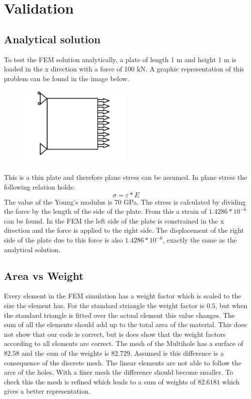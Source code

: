 \chapter{Validation}

\section{Analytical solution}
To test the FEM solution analytically, a plate of length 1 m and height 1 m is loaded in the x direction with a force of 100 kN. A graphic representation of this problem can be found in the image below.

\begin{figure}[h!]
    \parbox [t]{\textwidth}
        {
        \center
        \includegraphics[width=0.5\textwidth]{IMG/analytisch.png}
        }
\end{figure}

This is a thin plate and therefore plane stress can be assumed. In plane stress the following relation holds:
\[\sigma=\varepsilon*E\]
The value of the Young's modulus is 70 GPa. The stress is calculated by dividing the force by the length of the side of the plate. From this a strain of \(1.4286*10^{-6}\) can be found. 
In the FEM the left side of the plate is constrained in the x direction and the force is applied to the right side. The displacement of the right side of the plate due to this force is also \(1.4286*10^{-6}\), exactly the same as the analytical solution. 

\section{Area vs Weight}
Every element in the FEM simulation has a weight factor which is scaled to the size the element has. For the standard striangle the weight factor is $0.5$, but when the standard triangle is fitted over the actual element this value changes. The sum of all the elements should add up to the total area of the material. This does not show that our code is correct, but is does show that the weight factors according to all elements are correct. The mesh of the Multihole has a surface of $82.58$ and the sum of the weights is $82.729$. Assumed is this difference is a consequence of the discrete mesh. The linear elements are not able to follow the arcs of the holes. With a finer mesh the difference should become smaller. To check this the mesh is refined which leads to a sum of weights of $82.6181$ which gives a better representation.
